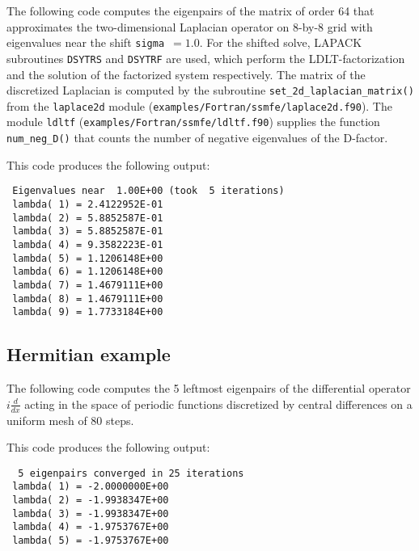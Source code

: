 The following code 
computes the eigenpairs of 
the matrix of order 64 that approximates 
the two-dimensional Laplacian operator
on 8-by-8 grid
with eigenvalues near the shift {\tt sigma $=1.0$}.
For the shifted solve, LAPACK subroutines {\tt DSYTRS} and
{\tt DSYTRF} are used,
which perform the LDLT-factorization and
the solution of the factorized system respectively.
The matrix of the discretized Laplacian is computed
by the subroutine {\tt set\_2d\_laplacian\_matrix()}
from the {\tt laplace2d} module (\texttt{examples/Fortran/ssmfe/laplace2d.f90}).
The module {\tt ldltf} (\texttt{examples/Fortran/ssmfe/ldltf.f90}) supplies
the function {\tt num\_neg\_D()}
that counts the number of negative eigenvalues of
the D-factor.

This code produces the following output:
\begin{verbatim}
 Eigenvalues near  1.00E+00 (took  5 iterations)
 lambda( 1) = 2.4122952E-01
 lambda( 2) = 5.8852587E-01
 lambda( 3) = 5.8852587E-01
 lambda( 4) = 9.3582223E-01
 lambda( 5) = 1.1206148E+00
 lambda( 6) = 1.1206148E+00
 lambda( 7) = 1.4679111E+00
 lambda( 8) = 1.4679111E+00
 lambda( 9) = 1.7733184E+00
\end{verbatim}

\subsection{Hermitian example}

The following code 
computes the 5 leftmost eigenpairs of 
the differential operator $i \frac{d}{dx}$
acting in the space of periodic functions
discretized by central differences on a uniform mesh
of 80 steps.

This code produces the following output:
\begin{verbatim}
  5 eigenpairs converged in 25 iterations
 lambda( 1) = -2.0000000E+00
 lambda( 2) = -1.9938347E+00
 lambda( 3) = -1.9938347E+00
 lambda( 4) = -1.9753767E+00
 lambda( 5) = -1.9753767E+00
\end{verbatim}
